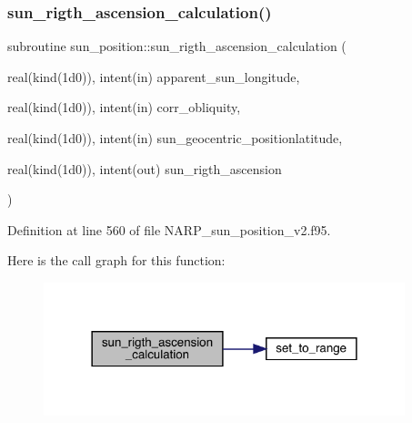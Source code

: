 \subsubsection{\texorpdfstring{sun\+\_\+rigth\+\_\+ascension\+\_\+calculation()}{sun\_rigth\_ascension\_calculation()}}
{\footnotesize\ttfamily subroutine sun\+\_\+position\+::sun\+\_\+rigth\+\_\+ascension\+\_\+calculation (\begin{DoxyParamCaption}\item[{real(kind(1d0)), intent(in)}]{apparent\+\_\+sun\+\_\+longitude,  }\item[{real(kind(1d0)), intent(in)}]{corr\+\_\+obliquity,  }\item[{real(kind(1d0)), intent(in)}]{sun\+\_\+geocentric\+\_\+positionlatitude,  }\item[{real(kind(1d0)), intent(out)}]{sun\+\_\+rigth\+\_\+ascension }\end{DoxyParamCaption})}



Definition at line 560 of file N\+A\+R\+P\+\_\+sun\+\_\+position\+\_\+v2.\+f95.

Here is the call graph for this function\+:\nopagebreak
\begin{figure}[H]
\begin{center}
\leavevmode
\includegraphics[width=298pt]{_n_a_r_p__sun__position__v2_8f95_a2f8a78070378bcea144d0fac36d574f6_cgraph}
\end{center}
\end{figure}
\mbox{\label{_n_a_r_p__sun__position__v2_8f95_a71be86eba8ca05519a30c0544be877e8}} 
